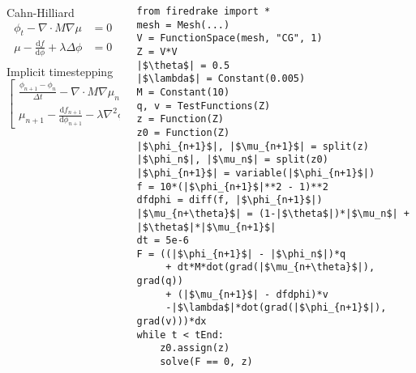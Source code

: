 \documentclass[presentation]{beamer}
\begin{document}
\begin{frame}[fragile]
  \begin{columns}
    \begin{column}{0.5\textwidth}
      \begin{block}{Cahn-Hilliard}
        \small
        \begin{align*}
          \phi_t - \nabla \cdot M \nabla \mu &= 0\\
          \mu - \frac{\text{d} f}{\text{d} \phi} + \lambda \Delta \phi &= 0\\
        \end{align*}
        Implicit timestepping
        \begin{equation*}
          \begin{bmatrix}
            \frac{\phi_{n+1} - \phi_n}{\Delta t} - \nabla \cdot M \nabla \mu_{n+\theta}\\
            \mu_{n+1} - \frac{\text{d} f_{n+1}}{\text{d} \phi_{n+1}} -
            \lambda \nabla^2\phi_{n+1}
          \end{bmatrix} = 0
        \end{equation*}
      \end{block}
    \end{column}
    \begin{column}{0.5\textwidth}
\begin{verbatim}
from firedrake import *
mesh = Mesh(...)
V = FunctionSpace(mesh, "CG", 1)
Z = V*V
|$\theta$| = 0.5
|$\lambda$| = Constant(0.005)
M = Constant(10)
q, v = TestFunctions(Z)
z = Function(Z)
z0 = Function(Z)
|$\phi_{n+1}$|, |$\mu_{n+1}$| = split(z)
|$\phi_n$|, |$\mu_n$| = split(z0)
|$\phi_{n+1}$| = variable(|$\phi_{n+1}$|)
f = 10*(|$\phi_{n+1}$|**2 - 1)**2
dfdphi = diff(f, |$\phi_{n+1}$|)
|$\mu_{n+\theta}$| = (1-|$\theta$|)*|$\mu_n$| + |$\theta$|*|$\mu_{n+1}$|
dt = 5e-6
F = ((|$\phi_{n+1}$| - |$\phi_n$|)*q 
     + dt*M*dot(grad(|$\mu_{n+\theta}$|), grad(q)) 
     + (|$\mu_{n+1}$| - dfdphi)*v
     -|$\lambda$|*dot(grad(|$\phi_{n+1}$|), grad(v)))*dx
while t < tEnd:
    z0.assign(z)
    solve(F == 0, z)
\end{verbatim}
    \end{column}
  \end{columns}
\end{frame}
\end{document}
